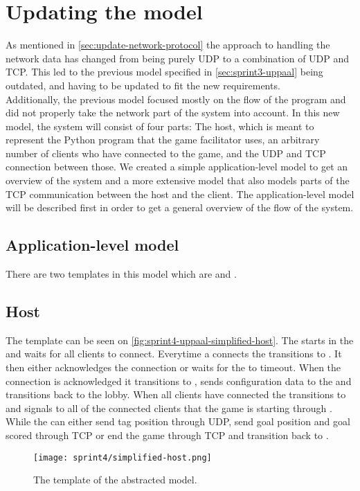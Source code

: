 \section{Updating the \uppaal model}
As mentioned in \autoref{sec:update-network-protocol} the approach to handling the network data has changed from being purely UDP to a combination of UDP and TCP.
This led to the previous \uppaal model specified in \autoref{sec:sprint3-uppaal} being outdated, and having to be updated to fit the new requirements.
\\
Additionally, the previous model focused mostly on the flow of the program and did not properly take the network part of the system into account.
In this new model, the system will consist of four parts: The host, which is meant to represent the Python program that the game facilitator uses, an arbitrary number of clients who have connected to the game, and the UDP and TCP connection between those.
We created a simple application-level model to get an overview of the system and a more extensive model that also models parts of the TCP communication between the host and the client.
The application-level model will be described first in order to get a general overview of the flow of the system.

\subsection{Application-level \uppaal model}
There are two templates in this model which are  and .

\subsection*{Host}
The  template can be seen on \autoref{fig:sprint4-uppaal-simplified-host}. 
The  starts in the  and waits for all clients to connect.
Everytime a  connects the  transitions to  .
It then either acknowledges the connection or waits for the   to timeout.
When the connection is acknowledged it transitions to , sends configuration data to the  and transitions back to the lobby.
When all clients have connected the  transitions to  and signals to all of the connected clients that the game is starting through .
While  the  can either send tag position through UDP, send goal position and goal scored through TCP or end the game through TCP and transition back to .
\begin{figure}[h]
    \centering
    \texttt{[image: sprint4/simplified-host.png]}
    \caption{The  template of the abstracted \uppaal model.}
    \label{fig:sprint4-uppaal-simplified-host}
\end{figure}

